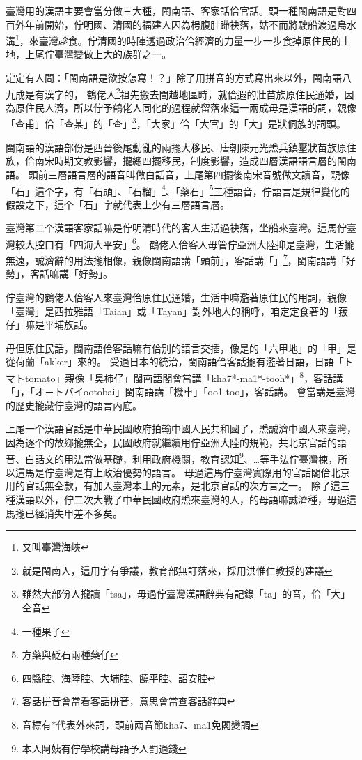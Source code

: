 \documentclass[final,oneside,onecolumn,12pt,a4paper]{book}%
\begin{document}
臺灣用的漢語主要會當分做三大種，閩南語、客家話佮官話\cite{外省族群的母語與國語}。頭一種閩南語是對四百外年前開始，佇明國、清國的福建人因為枵腹肚蹛袂落，姑不而將駛船渡過烏水溝\footnote{又叫臺灣海峽}，來臺灣趁食。佇清國的時陣透過政治佮經濟的力量一步一步食掉原住民的土地，上尾佇臺灣變做上大的族群之一。

定定有人問：「閩南語是欲按怎寫！？」除了用拼音的方式寫出來以外，閩南語八九成是有漢字的\cite{愛揣}，%
鶴佬人\footnote{就是閩南人，這用字有爭議，教育部無訂落來，採用洪惟仁教授的建議\cite{愛揣}}祖先搬去閩越地區時，就佮遐的壯苗族原住民通婚，因為原住民人濟，所以佇予鶴佬人同化的過程就留落來這一兩成毋是漢語的詞\cite{董忠司}，親像「查甫」佮「查某」的「查」\footnote{雖然大部份人攏讀「tsa」，毋過佇臺灣漢語辭典\cite{臺灣漢語辭典}有記錄「ta」的音，佮「大」仝音}，「大家」佮「大官」的「大」是狀侗族的詞頭。

閩南語的漢語部份是西晉後尾動亂的兩擺大移民、唐朝陳元光𤆬兵鎮壓狀苗族原住族，佮南宋時期文教影響，攏總四擺移民，制度影響，造成四層漢語語言層的閩南語\cite{閩客方言史稿}。
頭前三層語言層的語音叫做白話音，上尾第四擺後南宋音號做文讀音，親像「石」這个字，有「石頭」、「石榴」\footnote{一種果子}、「藥石」\footnote{方藥與砭石兩種藥仔}三種語音，佇語言是規律變化的假設之下，這个「石」字就代表上少有三層語言層。

臺灣第二个漢語客家話嘛是佇明清時代的客人生活過袂落，坐船來臺灣。這馬佇臺灣較大腔口有「四海大平安」\footnote{四縣腔、海陸腔、大埔腔、饒平腔、詔安腔}。
鶴佬人佮客人毋管佇亞洲大陸抑是臺灣，生活攏無遠，誠濟辭的用法攏相像，親像閩南語講「頭前」，客話講「」\footnote{客話拼音會當看客話拼音\cite{客話拼音}，意思會當查客話辭典\cite{客話辭典}}，閩南語講「好勢」，客話嘛講「好勢」。

佇臺灣的鶴佬人佮客人來臺灣佮原住民通婚，生活中嘛濫著原住民的用詞，親像「臺灣」是西拉雅語「Taian」或「Tayan」對外地人的稱呼\cite{台灣名稱的由來}，咱定定食著的「菝仔」嘛是平埔族話\cite{客語外來語}。

毋但原住民話，閩南語佮客話嘛有佮別的語言交插，像是的「六甲地」的「甲」是從荷蘭「akker」來的\cite{台甲}。
受過日本的統治，閩南語佮客話攏有濫著日語，日語「トマトtomato」親像「臭柿仔」閩南語閣會當講「kha7*-ma1*-tooh*」\footnote{音標有*代表外來詞，頭前兩音節kha7、ma1免閣變調}，客話講「」，「オ－トバイootobai」閩南語講「機車」「oo1-too」，客話講。
會當講是臺灣的歷史攏藏佇臺灣的語言內底。

上尾一个漢語官話是中華民國政府拍輸中國人民共和國了，𤆬誠濟中國人來臺灣，因為逐个的故鄉攏無仝\cite{外省族群的母語與國語}，民國政府就繼續用佇亞洲大陸的規範，共北京官話的語音、白話文的用法當做基礎，利用政府機關，教育認知\footnote{本人阿姨有佇學校講母語予人罰過錢}、…等手法佇臺灣捒，所以這馬是佇臺灣是有上政治優勢的語言。
毋過這馬佇臺灣實際用的官話閣佮北京用的官話無仝款，有加入臺灣本土的元素，是北京官話的次方言之一。
除了這三種漢語以外，佇二次大戰了中華民國政府𤆬來臺灣的人，的母語嘛誠濟種，毋過這馬攏已經消失甲差不多矣。
\end{document}
